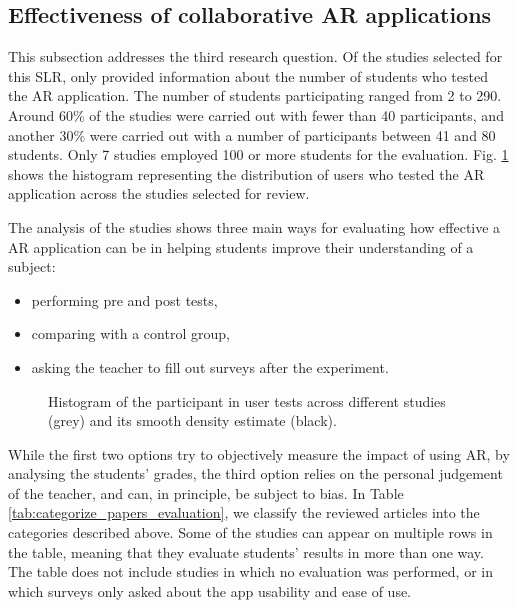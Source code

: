 \subsection{Effectiveness of collaborative AR applications}

This subsection addresses the third research question. Of the \papersSelected studies selected for this \gls{SLR}, only \papersWithNumStudentInfo provided information about the number of students who tested the AR application. The number of students participating ranged from 2 to 290. Around 60\% of the studies were carried out with fewer than 40 participants, and another 30\% were carried out with a number of participants between 41 and 80 students. Only 7 studies employed 100 or more students for the evaluation. Fig. \ref{fig:testers} shows the histogram representing the distribution of users who tested the \gls{AR} application across the studies selected for review.

The analysis of the studies shows three main ways for evaluating how effective a \gls{AR} application can be in helping students improve their understanding of a subject:
\begin{itemize}
    \item performing pre and post tests,
    \item comparing with a control group,
    \item asking the teacher to fill out surveys after the experiment.
\end{itemize}

\begin{figure}[ht]	
	\begin{center}
	
	\caption{Histogram of the participant in user tests across different studies (grey) and its smooth density estimate (black).}
	\label{fig:testers}
    \end{center}
\end{figure}

While the first two options try to objectively measure the impact of using \gls{AR}, by analysing the students' grades, the third option relies on the personal judgement of the teacher, and can, in principle, be subject to bias.
In Table \ref{tab:categorize_papers_evaluation}, we classify the \papersSelected reviewed articles into the categories described above. Some of the studies can appear on multiple rows in the table, meaning that they evaluate students' results in more than one way. The table does not include studies in which no evaluation was performed, or in which surveys only asked about the app usability and ease of use.

